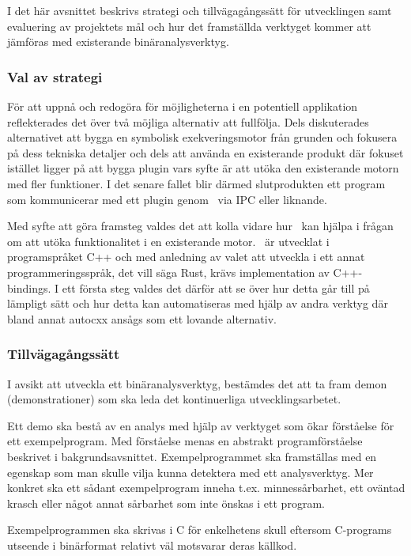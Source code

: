 
I det här avsnittet beskrivs strategi och tillvägagångssätt för utvecklingen
samt evaluering av projektets mål och hur det framställda verktyget kommer att
jämföras med existerande binäranalysverktyg.

\subsubsection{Val av strategi}

För att uppnå och redogöra för möjligheterna i en potentiell applikation
reflekterades det över två möjliga alternativ att fullfölja. Dels diskuterades
alternativet att bygga en symbolisk exekveringsmotor från grunden och fokusera
på dess tekniska detaljer och dels att använda en existerande produkt där
fokuset istället ligger på att bygga plugin vars syfte är att utöka den
existerande motorn med fler funktioner. I det senare fallet blir därmed
slutprodukten ett program som kommunicerar med ett plugin genom \stoe\ via IPC
eller liknande. 

Med syfte att göra framsteg valdes det att kolla vidare hur \stoe\ kan hjälpa i
frågan om att utöka funktionalitet i en existerande motor. \stoe\ är utvecklat
i programspråket C++ och med anledning av valet att utveckla i ett
annat programmeringsspråk, det vill säga Rust, krävs implementation av
C++-bindings. I ett första steg valdes det därför att se över hur detta går till
på lämpligt sätt och hur detta kan automatiseras med hjälp av andra verktyg
där bland annat autocxx ansågs som ett lovande alternativ.

\subsubsection{Tillvägagångssätt}

I avsikt att utveckla ett binäranalysverktyg, bestämdes det att ta fram demon
(demonstrationer) som ska leda det kontinuerliga utvecklingsarbetet.

Ett demo ska bestå av en analys med hjälp av verktyget som ökar förståelse för
ett exempelprogram. Med förståelse menas en abstrakt programförståelse
beskrivet i bakgrundsavsnittet. Exempelprogrammet ska framställas med en
egenskap som man skulle vilja kunna detektera med ett analysverktyg. Mer
konkret ska ett sådant exempelprogram inneha t.ex. minnessårbarhet, ett oväntad
krasch eller något annat sårbarhet som inte önskas i ett program.

Exempelprogrammen ska skrivas i C för enkelhetens skull eftersom C-programs
utseende i binärformat relativt väl motsvarar deras källkod. 

